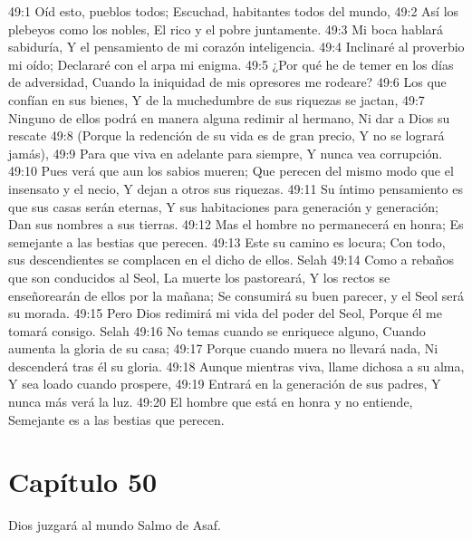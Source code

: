 49:1 Oíd esto, pueblos todos; 
Escuchad, habitantes todos del mundo, 
49:2 Así los plebeyos como los nobles, 
El rico y el pobre juntamente. 
49:3 Mi boca hablará sabiduría, 
Y el pensamiento de mi corazón inteligencia. 
49:4 Inclinaré al proverbio mi oído; 
Declararé con el arpa mi enigma. 
49:5 ¿Por qué he de temer en los días de adversidad, 
Cuando la iniquidad de mis opresores me rodeare? 
49:6 Los que confían en sus bienes, 
Y de la muchedumbre de sus riquezas se jactan, 
49:7 Ninguno de ellos podrá en manera alguna redimir al hermano, 
Ni dar a Dios su rescate 
49:8 (Porque la redención de su vida es de gran precio, 
Y no se logrará jamás), 
49:9 Para que viva en adelante para siempre, 
Y nunca vea corrupción. 
49:10 Pues verá que aun los sabios mueren; 
Que perecen del mismo modo que el insensato y el necio, 
Y dejan a otros sus riquezas. 
49:11 Su íntimo pensamiento es que sus casas serán eternas, 
Y sus habitaciones para generación y generación; 
Dan sus nombres a sus tierras. 
49:12 Mas el hombre no permanecerá en honra; 
Es semejante a las bestias que perecen. 
49:13 Este su camino es locura; 
Con todo, sus descendientes se complacen en el dicho de ellos. Selah 
49:14 Como a rebaños que son conducidos al Seol, 
La muerte los pastoreará, 
Y los rectos se enseñorearán de ellos por la mañana; 
Se consumirá su buen parecer, y el Seol será su morada. 
49:15 Pero Dios redimirá mi vida del poder del Seol, 
Porque él me tomará consigo. Selah 
49:16 No temas cuando se enriquece alguno, 
Cuando aumenta la gloria de su casa; 
49:17 Porque cuando muera no llevará nada, 
Ni descenderá tras él su gloria. 
49:18 Aunque mientras viva, llame dichosa a su alma, 
Y sea loado cuando prospere, 
49:19 Entrará en la generación de sus padres, 
Y nunca más verá la luz. 
49:20 El hombre que está en honra y no entiende, 
Semejante es a las bestias que perecen. 
\section*{Capítulo 50}
Dios juzgará al mundo 
Salmo de Asaf. 
 
